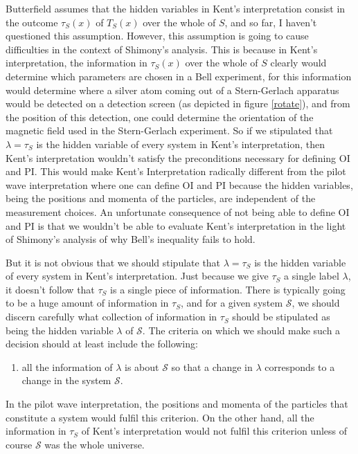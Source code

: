 Butterfield assumes that the hidden variables in Kent's interpretation consist in the outcome $\tau_S(x)$ of $T_S(x)$ over the whole of $S$, and so far, I haven't questioned this assumption. However, this assumption is going to cause difficulties in the context of Shimony's analysis. This is because in Kent's interpretation, the information in $\tau_S(x)$ over the whole of $S$ clearly would determine which parameters are chosen in a Bell experiment, for this information would determine where a silver atom coming out of a Stern-Gerlach apparatus would be detected on a detection screen (as depicted in figure \ref{rotate}), and from the position of this detection, one could determine the orientation of the magnetic field used in the Stern-Gerlach experiment. So if we stipulated that $\lambda=\tau_S$ is the hidden variable of every system in Kent's interpretation, then Kent's interpretation wouldn't satisfy the preconditions necessary for defining OI and PI. This would make Kent's Interpretation radically different from the pilot wave interpretation where one can define OI and PI because the hidden variables, being the positions and momenta of the particles, are independent of the measurement choices. An unfortunate consequence of not being able to define OI and PI is that we wouldn't be able to evaluate Kent's interpretation in the light of Shimony's analysis of why Bell's inequality fails to hold. 

But it is not obvious that we should stipulate that $\lambda=\tau_S$ is the hidden variable of every system in Kent's interpretation. Just because we give $\tau_S$ a single label $\lambda$, it doesn't follow that $\tau_S$ is a single piece of information. There is typically going to be a huge amount of information in $\tau_S$, and for a given system $\mathcal{S}$, we should  discern carefully what collection of information in $\tau_S$ should be stipulated as being the hidden variable $\lambda$ of $\mathcal{S}$. The criteria on which we should make such a decision should at least include the following:
\begin{enumerate}
	\item all the information of $\lambda$ is about $\mathcal{S}$ so that a change in $\lambda$ corresponds to a change in the system $\mathcal{S}$.\label{hidden1}
\end{enumerate} 
In the pilot wave interpretation, the positions and momenta of the particles that constitute a system would fulfil this criterion. On the other hand, all the information in $\tau_S$ of Kent's interpretation would not fulfil this criterion unless of course $\mathcal{S}$ was the whole universe. 

